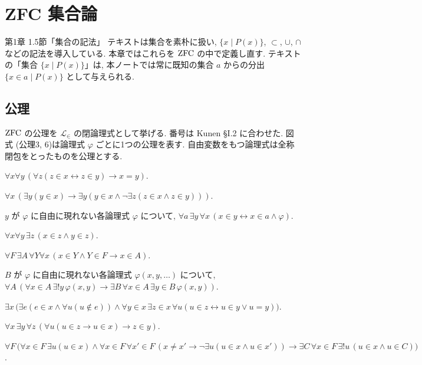 \chapter{ZFC 集合論}\label{ch:zfc}

\begin{textref}{第1章 1.5節「集合の記法」}
  テキストは集合を素朴に扱い, $\{x \mid P(x)\}$, $\subset$, $\cup$, $\cap$ などの記法を導入している. 本章ではこれらを $\mathrm{ZFC}$ の中で定義し直す. テキストの「集合 $\{x \mid P(x)\}$」は, 本ノートでは常に既知の集合 $a$ からの分出 $\{x \in a \mid P(x)\}$ として与えられる.
\end{textref}

\section{公理}

$\mathrm{ZFC}$ の公理を $\mathcal{L}_\in$ の閉論理式として挙げる. 番号は Kunen \cite{kunen2011} \S I.2 に合わせた. 図式 (公理3, 6)は論理式 $\varphi$ ごとに1つの公理を表す. 自由変数をもつ論理式は全称閉包をとったものを公理とする.

\begin{axm}
  $\forall x\forall y\,(\forall z(z \in x \leftrightarrow z \in y) \to x = y)$.
\end{axm}
\begin{axm}[基礎 Found]
  $\forall x\,(\exists y(y \in x) \to \exists y(y \in x \land \neg\exists z(z \in x \land z \in y)))$.
\end{axm}
\begin{axm}[分出 Sep]
  $y$ が $\varphi$ に自由に現れない各論理式 $\varphi$ について, $\forall a\,\exists y\,\forall x\,(x \in y \leftrightarrow x \in a \land \varphi)$.
\end{axm}
\begin{axm}[対 Pair]
  $\forall x\forall y\,\exists z\,(x \in z \land y \in z)$.
\end{axm}
\begin{axm}
  $\forall F\,\exists A\,\forall Y\forall x\,(x \in Y \land Y \in F \to x \in A)$.
\end{axm}
\begin{axm}[置換 Repl]
  $B$ が $\varphi$ に自由に現れない各論理式 $\varphi(x,y,\ldots)$ について,
  $\forall A\,(\forall x \in A\,\exists ! y\,\varphi(x,y) \to \exists B\,\forall x \in A\,\exists y \in B\,\varphi(x,y))$.
\end{axm}
\begin{axm}[無限 Inf]
  $\exists x\,\bigl(\exists e(e \in x \land \forall u(u \notin e)) \land \forall y \in x\,\exists z \in x\,\forall u(u \in z \leftrightarrow u \in y \lor u = y)\bigr)$.
\end{axm}
\begin{axm}
  $\forall x\,\exists y\,\forall z\,(\forall u(u \in z \to u \in x) \to z \in y)$.
\end{axm}
\begin{axm}[選択 AC]
  $\forall F\,\bigl(\forall x \in F\,\exists u(u \in x) \land \forall x \in F\,\forall x' \in F\,(x \neq x' \to \neg\exists u(u \in x \land u \in x')) \to \exists C\,\forall x \in F\,\exists ! u\,(u \in x \land u \in C)\bigr)$.
\end{axm}

